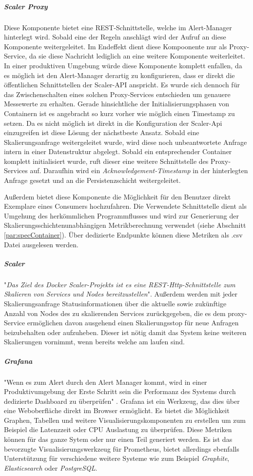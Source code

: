 \subparagraph{Scaler Proxy}
Diese Komponente bietet eine REST-Schnittstelle, welche im Alert-Manager hinterlegt wird. Sobald eine der Regeln anschlägt wird der Aufruf an diese Komponente weitergeleitet. Im Endeffekt dient diese Kompoonente nur als Proxy-Service, da sie diese Nachricht lediglich an eine weitere Komponente weiterleitet. In einer produktiven Umgebung würde diese Komponente komplett enfallen, da es möglich ist den Alert-Manager derartig zu konfigurieren, dass er direkt die öffentlichen Schnittstellen der Scaler-API anspricht. Es wurde sich dennoch für das Zwischenschalten eines solchen Proxy-Services entschieden um genauere Messewerte zu erhalten. Gerade hinsichtliche der Initialisierungsphasen von Containern ist es angebracht so kurz vorher wie möglich einen Timestamp zu setzen. Da es nicht möglich ist direkt in die Konfiguration der Scaler-Api einzugreifen ist diese Lösung der nächstbeste Ansatz. Sobald eine Skalierungsanfrage weitergeleitet wurde, wird diese noch unbeantwortete Anfrage intern in einer Datenstruktur abgelegt. Sobald ein entsprechender Container komplett initialisiert wurde, ruft dieser eine weitere Schnittstelle des Proxy-Services auf. Daraufhin wird ein \emph{Acknowledgement-Timestamp} in der hinterlegten Anfrage gesetzt und an die Persistenzschicht weitergeleitet. 

Außerdem bietet diese Komponente die Möglichkeit für den Benutzer direkt Exemplare eines Consumers hochzufahren. Die Verwendete Schnittstelle dient als Umgehung des herkömmlichen Programmflusses und wird zur Generierung der Skalierungsschichtenunabhängigen Metrikberechnung verwendet (siehe Abschnitt \ref{par:specContainer}). Über dedizierte Endpunkte können diese Metriken als .csv Datei ausgelesen werden. 


\subparagraph{Scaler}
"\emph{Das Ziel des Docker Scaler-Projekts ist es eine REST-Http-Schnittstelle zum Skalieren von Services und Nodes bereitzustellen}"\cite{docker-scaler}. Außerdem werden mit jeder Skalierungsanfrage Statusinformationen über die aktuelle sowie zukünftige Anzahl von Nodes des zu skalierenden Services zurückgegeben, die es dem proxy-Service ermöglichen davon ausgehend einen Skalierungsstop für neue Anfragen beizubehalten oder aufzuheben. Dieser ist nötig damit das System keine weiteren Skalierungen vornimmt, wenn bereits welche am laufen sind.


\subparagraph{Grafana}
"Wenn es zum Alert durch den Alert Manager kommt, wird in einer Produktivumgebung der Erste Schritt sein die Performanz des Systems durch dedizierte Dashboard zu überprüfen" \cite[Kapitel~6]{oreillyPrometheus}. Grafana ist ein Werkzeug, das dies über eine Weboberfläche direkt im Browser ermöglicht. Es bietet die Möglichkeit Graphen, Tabellen und weitere Visualisierungskomponenten zu erstellen um zum Beispiel die Latenzzeit oder CPU Auslastung zu überprüfen. Diese Metriken können für das ganze Sytem oder nur einen Teil generiert werden. Es ist das bevorzugte Visualisierungswerkzeug für Prometheus, bietet allerdings ebenfalls Unterstützung für verschiedene weitere Systeme wie zum Beispiel \emph{Graphite}, \emph{Elasticsearch} oder \emph{PostgreSQL}.


